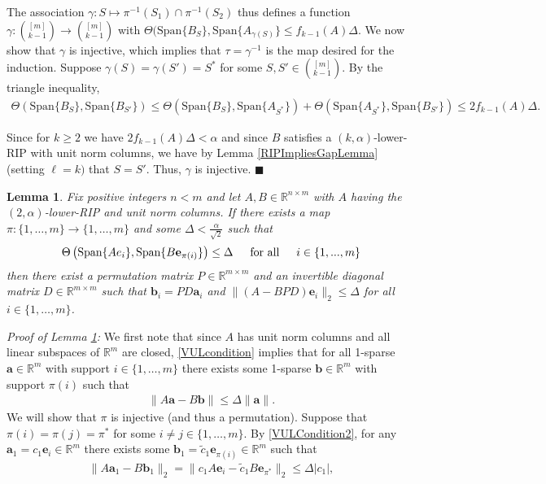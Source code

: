 \documentclass[journal,onecolumn]{IEEEtran}
\newtheorem{lemma}{Lemma}
\begin{document}
The association $\gamma: S \mapsto \pi^{-1}(S_1) \cap \pi^{-1}(S_2)$ thus defines a function $\gamma: {[m] \choose k-1} \to {[m] \choose k-1}$ with $\Theta(\text{Span}\{B_S\}, \text{Span}\{A_{\gamma(S)}\} \leq f_{k-1}(A)\Delta$. We now show that $\gamma$ is injective, which implies that $\tau = \gamma^{-1}$ is the map desired for the induction. Suppose $\gamma(S) = \gamma(S') = S^*$ for some $S, S' \in {[m] \choose k-1}$.  By the triangle inequality,
\begin{align}\label{lt2d}
\Theta(\text{Span}\{B_S\}, \text{Span}\{B_{S'}\}) \leq \Theta(\text{Span}\{B_S\}, \text{Span}\{A_{S^*}\}) + \Theta(\text{Span}\{A_{S^*}\}, \text{Span}\{B_{S'}\})
\leq 2f_{k-1}(A)\Delta.
\end{align}

Since for $k \geq 2$ we have $2f_{k-1}(A)\Delta < \alpha$ and since $B$ satisfies a $(k, \alpha)$-lower-RIP with unit norm columns, we have by Lemma \ref{RIPImpliesGapLemma} (setting $\ell = k)$ that $S = S'$. Thus, $\gamma$ is injective. \indent $\blacksquare$


\begin{lemma}\label{VectorUniquenessLemma}
Fix positive integers $n < m$ and let $A,B \in \mathbb{R}^{n \times m}$ with $A$ having the $(2,\alpha)$-lower-RIP and unit norm columns. If there exists a map $\pi: \{1, \ldots, m\} \to \{1, \ldots, m\} $ and some $\Delta < \frac{\alpha}{\sqrt{2}}$ such that
\begin{align}\label{VULcondition}
\Theta\left( \text{Span}\{Ae_i\}, \text{Span}\{B\mathbf{e}_{\pi(i)}\} \right) \leq \Delta \indent \text{for all} \indent i \in \{1, ..., m \}
\end{align}
%
then there exist a permutation matrix $P \in \mathbb{R}^{m \times m}$ and an invertible diagonal matrix $D \in \mathbb{R}^{m \times m}$ such that $\mathbf{b}_i = PD\mathbf{a}_i$ and $\|(A - BPD)\mathbf{e}_i\|_2 \leq \Delta$ for all $i \in \{1, \ldots, m\}$.
\end{lemma}

\emph{Proof of Lemma \ref{VectorUniquenessLemma}:}
We first note that since $A$ has unit norm columns and all linear subspaces of $\mathbb{R}^m$ are closed, \eqref{VULcondition} implies that for all 1-sparse $\mathbf{a} \in \mathbb{R}^m$ with support $i \in \{1, \ldots, m\}$ there exists some 1-sparse $\mathbf{b} \in \mathbb{R}^m$ with support $\pi(i)$ such that 
\begin{align}\label{VULCondition2}
\|A\mathbf{a} - B\mathbf{b}\| \leq \Delta\|\mathbf{a}\|.
\end{align}
We will show that $\pi$ is injective (and thus a permutation). Suppose that $\pi(i) = \pi(j) = \pi^*$ for some $i \neq j \in \{1, \ldots, m\}$. By \eqref{VULCondition2}, for any $\mathbf{a}_1 = c_1\mathbf{e}_i \in \mathbb{R}^m$ there exists some $\mathbf{b}_1 = \tilde c_1 \mathbf{e}_{\pi(i)} \in \mathbb{R}^m$ such that
\begin{align}\label{VUL1}
\|A\mathbf{a}_1 - B\mathbf{b}_1\|_2 = \|c_1A\mathbf{e}_i - \tilde{c}_1B\mathbf{e}_{\pi^*}\|_2 \leq \Delta |c_1|,
\end{align}
\end{document}
